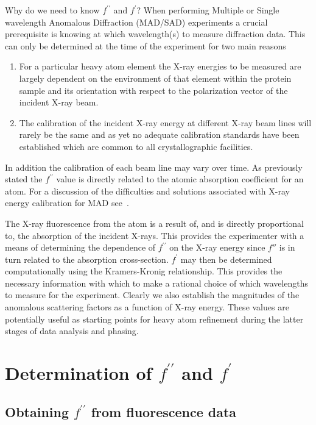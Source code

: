 \documentclass[a4paper]{article}
\begin{document}
Why do we need to know $f^{\prime\prime}$ and $f^{\prime}$?  When
performing Multiple or Single wavelength Anomalous Diffraction
(MAD/SAD) experiments a crucial prerequisite is knowing at which
wavelength(s) to measure diffraction data. This can only be determined
at the time of the experiment for two main reasons
\begin{enumerate}
\item For a particular heavy atom element the X-ray
energies to be measured are largely dependent on the environment of
that element within the protein sample and its orientation with
respect to the polarization vector of the incident X-ray beam.
\item The calibration of the incident X-ray energy at different X-ray
beam lines will rarely be the same and as yet no adequate calibration
standards have been established which are common to all
crystallographic facilities.
\end{enumerate}
In addition the calibration of each beam line may vary over time.  As
previously stated the $f^{\prime\prime}$ value is directly related to
the atomic absorption coefficient for an atom. For a discussion of the
difficulties and solutions associated with X-ray energy calibration
for MAD see~\cite{evans96:_stabil}. 

The X-ray fluorescence from the atom is a result of, and is directly
proportional to, the absorption of the incident X-rays. This provides
the experimenter with a means of determining the dependence of
$f^{\prime\prime}$ on the X-ray energy since $f''$ is in turn related
to the absorption cross-section. $f^{\prime}$ may then be determined
computationally using the Kramers-Kronig relationship. This provides
the necessary information with which to make a rational choice of
which wavelengths to measure for the experiment. Clearly we also
establish the magnitudes of the anomalous scattering factors as a
function of X-ray energy. These values are potentially useful as
starting points for heavy atom refinement during the latter stages of
data analysis and phasing.

\section*{Determination of $f^{\prime\prime}$ and $f^{\prime}$}

\subsection*{Obtaining $f^{\prime\prime}$ from fluorescence data}
\end{document}
